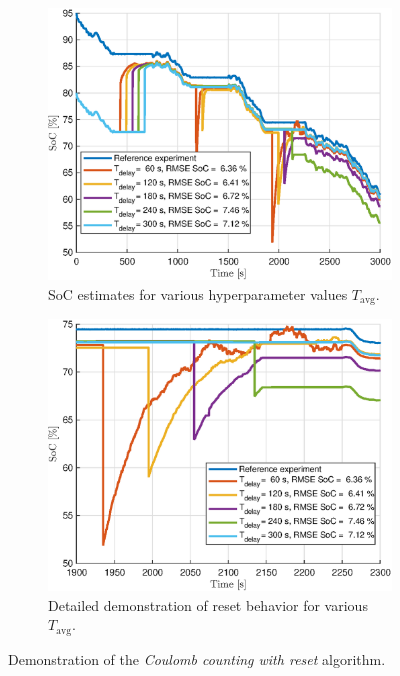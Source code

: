 \begin{figure}[htbp]
    \centering

\begin{subfigure}{0.49\textwidth}
    \centering
    \includegraphics[width=\textwidth]{figures/7/combination-SOC.eps}
    \caption{SoC estimates for various hyperparameter values $T_\text{avg}$.}
    \label{fig:7-combination-SOC-macro}
    \end{subfigure}
    \hfill
    \begin{subfigure}{0.49\textwidth}
    \centering
    \includegraphics[width=\textwidth]{figures/7/combination-SOC-detail.eps}
    \caption{Detailed demonstration of reset behavior for various $T_\text{avg}$.}
    \label{fig:7-combination-SOC-detail}
    \end{subfigure}
    
    \caption{Demonstration of the \textit{Coulomb counting with reset} algorithm.}
    \label{fig:7-combination-SOC}
\end{figure}

